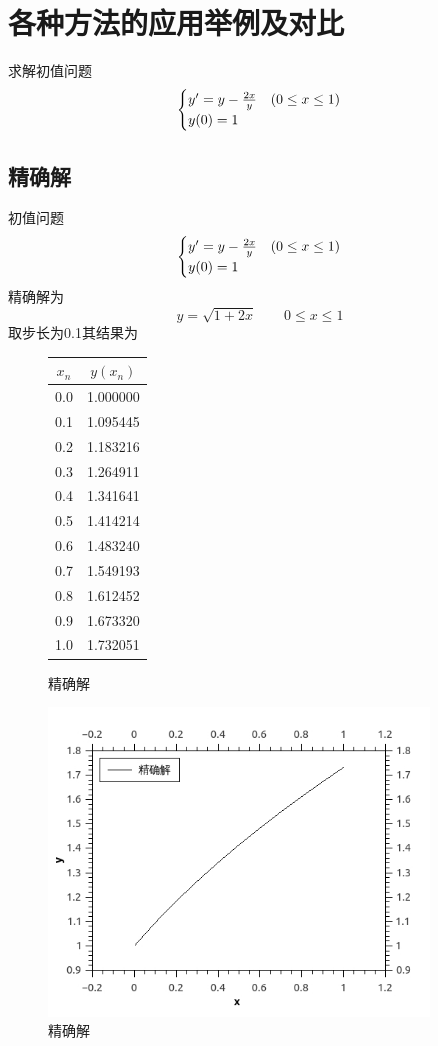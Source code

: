 \section{各种方法的应用举例及对比}
求解初值问题
$$\begin{cases}y\rq{}=y-\frac{2x}{y} &(0\le x \le 1)\\ y(0)=1\end{cases}$$



\subsection{精确解}
初值问题
$$\begin{cases}y\rq{}=y-\frac{2x}{y} &(0\le x \le 1)\\ y(0)=1\end{cases}$$
精确解为
$$y=\sqrt{1+2x} \qquad 0\le x \le 1$$
取步长为0.1其结果为
\begin{figure}[htb]
\begin{minipage}[b]{0.5\textwidth}
\centering
\begin{tabular}{c|c}
$x_n$ & $y(x_n)$\\
\hline
 0.0     &      1.000000\\
 0.1	&	1.095445\\
0.2	&	1.183216\\
0.3	&	1.264911\\
0.4	&	1.341641\\
0.5	&	1.414214\\
0.6	&	1.483240\\
0.7	&	1.549193\\
0.8	&	1.612452\\
0.9	&	1.673320\\
1.0	&	1.732051\\
\end{tabular}
\caption{精确解}
\end{minipage}%
\begin{minipage}[b]{0.5\textwidth}
\centering
\includegraphics[width=0.9\textwidth]{program/numerical_analysis_examples/exact_solution.jpeg}
\caption{精确解}
\label{fig:by:table}
\end{minipage}
\end{figure}

